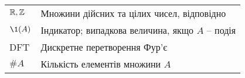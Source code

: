 
\bigskip


\begin{tabular}{ll}

    $\mathbb R, \mathbb Z$ & Множини дійсних та цілих чисел, відповідно \\
    $\1(A)$ & Індикатор; випадкова величина, якщо $A$ -- подія\\
    DFT & Дискретне перетворення Фур'є\\
    $\# A$ & Кількість елементів множини $A$\\


\end{tabular}